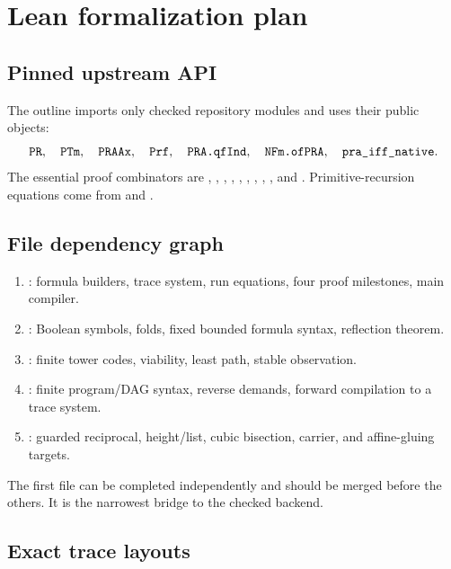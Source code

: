 \section{Lean formalization plan}
\label{sec:leanplan}

\subsection{Pinned upstream API}

The outline imports only checked repository modules and uses their public
objects:
\[
\code{PR},\quad \code{PTm},\quad \code{PRAAx},\quad
\code{Prf},\quad \code{PRA.qfInd},\quad
\code{NFm.ofPRA},\quad \code{pra_iff_native}.
\]
The essential proof combinators are
, , ,
, , ,
, , , and
.  Primitive-recursion equations come from
 and .

\subsection{File dependency graph}

\begin{enumerate}
\item {}: formula builders, trace system, run
equations, four proof milestones, main compiler.
\item {}: Boolean symbols, folds, fixed bounded
formula syntax, reflection theorem.
\item {}: finite tower codes, viability, least
path, stable observation.
\item {}: finite program/DAG syntax, reverse demands,
forward compilation to a trace system.
\item {}: guarded reciprocal, height/list, cubic
bisection, carrier, and affine-gluing targets.
\end{enumerate}

The first file can be completed independently and should be merged before the
others.  It is the narrowest bridge to the checked backend.

\subsection{Exact trace layouts}

